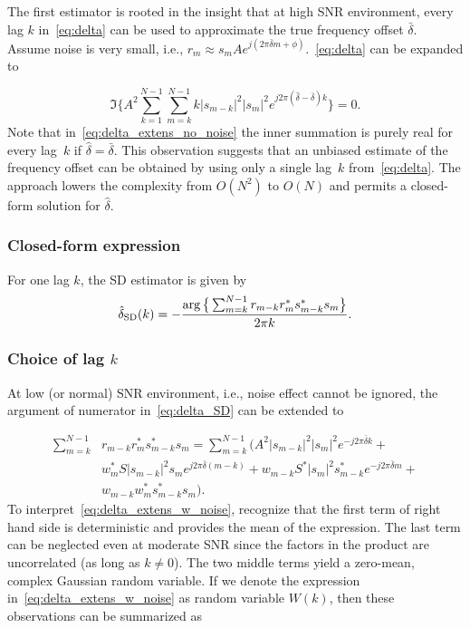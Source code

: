 The first estimator is rooted in the insight that at high SNR environment, every lag $k$ in~\eqref{eq:delta} can be used to
approximate the true frequency offset $\bar{\delta}$. Assume noise is very small, i.e.,
$r_m \approx s_mAe^{j(2\pi \bar{\delta} m+\phi)}$.~\eqref{eq:delta} can be expanded to

\begin{equation}
    \label{eq:delta_extens_no_noise}
    \Im\bigg\{A^2\sum_{k=1}^{N-1}\sum_{m=k}^{N-1}k|s_{m-k}|^2|s_m|^2e^{j2\pi (\hat{\delta}-\bar{\delta})k}\bigg\}=0.
    \end{equation}
Note that in~\eqref{eq:delta_extens_no_noise} the inner summation is purely real for every lag~$k$ if $\hat{\delta}=\bar{\delta}$.
This observation suggests that an unbiased estimate of the frequency offset can be obtained by using only a single lag~$k$
from~\eqref{eq:delta}. The approach lowers the complexity from $O(N^2)$ to $O(N)$ and permits a closed-form solution for $\hat{\delta}$.  

\subsubsection{Closed-form expression} 
For one lag $k$, the SD estimator is given by
\begin{equation}
    \label{eq:delta_SD}
    \hat{\delta}_{\text{SD}}(k)=-\frac{\arg\big\{\sum_{m=k}^{N-1}r_{m-k}r_m^*s_{m-k}^*s_m\big\}}{2\pi k}.
\end{equation}

\subsubsection{Choice of lag $k$}
At low (or normal) SNR environment, i.e., noise effect cannot be ignored, the argument of numerator in~\eqref{eq:delta_SD} can be extended to 

\begin{equation}
    \label{eq:delta_extens_w_noise}
    \begin{aligned}
      \sum_{m=k}^{N-1}&r_{m-k}r_m^*s_{m-k}^*s_m= \sum_{m=k}^{N-1} \Big( A^2|s_{m-k}|^2|s_m|^2e^{-j2\pi \bar{\delta} k} + \\
      &w_m^* S|s_{m-k}|^2s_m e^{j2\pi \bar{\delta}(m-k)} + w_{m-k}S^*|s_m|^2s_{m-k}^* e^{-j2\pi \bar{\delta} m} + \\
      &w_{m-k}w_m^*s_{m-k}^*s_m \Big) .
    \end{aligned}
    \end{equation}
To interpret~\eqref{eq:delta_extens_w_noise}, recognize that the first term of right hand side is
deterministic and provides the mean of the expression.
The last term can be neglected even at moderate SNR since the
factors in the product are uncorrelated (as long as $k \neq 0$).
The two middle terms yield a zero-mean, complex Gaussian random variable.
If we denote the expression in~\eqref{eq:delta_extens_w_noise} as random variable $W(k)$,
then these observations can be summarized as 

